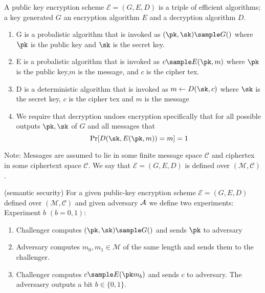 A public key encryption scheme \(\mathcal{E}  = (G,E,D)\) is a triple of efficient algorithms; a key generated \(G\) an encryption algorithm \(E\) and a decryption algorithm \(D\). 
\begin{enumerate}
    \item G is a probalistic algorithm that is invoked as \( (\pk, \sk) \sample G()\) where \(\pk\) is the public key and \(\sk\) is the secret key. 
    \item E is a probalistic algorithm that is invoked as \(c \sample E(\pk, m)\)  where \(\pk\) is the public key,\(m\) is the message, and \(c\) is the cipher tex.      
    \item D is a deterministic algorithm that is invoked as \(m \gets D(\sk, c)\) where \(\sk\) is the secret key, \(c\) is the cipher tex and \(m\) is the message 
    \item We require that decryption undoes encryption specifically that for all possible outputs \(\pk, \sk\) of \(G\) and all messages that 
    \[
        \Pr[D(\sk, E(\pk, m)) = m] = 1
    \]    
    
\end{enumerate}    

Note: Messages are assumed to lie in some finite message space \(\mathcal{C}\) and ciphertex in some ciphertext space \(\mathcal{C}\). We say that \(\mathcal{E} = (G, E,D)\) is defined over \((\mathcal{M}, \mathcal{C})\). 

\begin{attackGame}(semantic security)
    For a given public-key encryption scheme \(\mathcal{E} = (G,E,D)\) defined over \((\mathcal{M}, \mathcal{C})\)  and given adversary \(\mathcal{A}\) we define two experiments: 
    Experiment \(b\) \((b= 0,1)\):
    
    \begin{enumerate}
        \item Challenger computes \((\pk, \sk) \sample G()\) and sends \(\pk\) to adversary
        \item Adversary computes \(m_0, m_1 \in \mathcal{M}\) of the same length and sends them to the challenger. 
        \item Challenger computes \(c \sample E(\pk m_b)\) and sends \(c\) to adversary. 
        The adversasry outputs a bit \(b \in \{0, 1\}\).       
    \end{enumerate}
    \label{AG::SS}
\end{attackGame}

